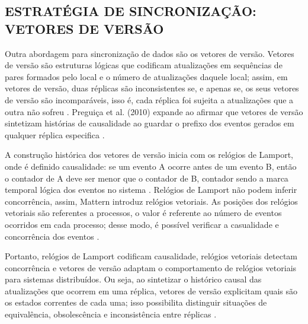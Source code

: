 \subsection{ESTRATÉGIA DE SINCRONIZAÇÃO: VETORES DE VERSÃO}

Outra abordagem para sincronização de dados são os vetores de versão. Vetores de versão são estruturas lógicas que codificam atualizações em sequências de pares formados pelo local e o número de atualizações daquele local; assim, em vetores de versão, duas réplicas são inconsistentes se, e apenas se, os seus vetores de versão são incomparáveis, isso é, cada réplica foi sujeita a atualizações que a outra não sofreu \cite{parker1983detection}.  Preguiça et al. (2010) expande ao afirmar que vetores de versão sintetizam histórias de causalidade ao guardar o prefixo dos eventos gerados em qualquer réplica especifica \cite{preguica2010dotted}.

A construção histórica dos vetores de versão inicia com os relógios de Lamport, onde é definido causalidade: se um evento A ocorre antes de um evento B, então o contador de A deve ser menor que o contador de B, contador sendo a marca temporal lógica dos eventos no sistema \cite{lamport1978time}. Relógios de Lamport não podem inferir concorrência, assim, Mattern introduz relógios vetoriais. As posições dos relógios vetoriais são referentes a processos, o valor é referente ao número de eventos ocorridos em cada processo; desse modo, é possível verificar a casualidade e concorrência dos eventos \cite{mattern1989virtual}. 

Portanto, relógios de Lamport codificam causalidade, relógios vetoriais detectam concorrência e vetores de versão adaptam o comportamento de relógios vetoriais para sistemas distribuídos. Ou seja, ao sintetizar o histórico causal das atualizações que ocorrem em uma réplica, vetores de versão explicitam quais são os estados correntes de cada uma; isso possibilita distinguir situações de equivalência, obsolescência e inconsistência entre réplicas \cite{almeida2002versionstamps}. 

